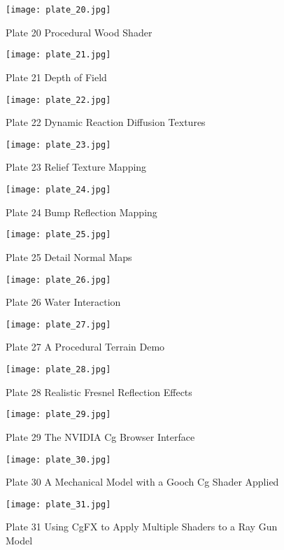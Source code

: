 \documentclass[../main.tex]{subfiles}
\begin{document}
\FloatBarrier
\begin{figure}
    \centering
    \texttt{[image: plate\_20.jpg]}
    \caption{Plate 20 Procedural Wood Shader}
    \label{fig:plate-20}
\end{figure}
\FloatBarrier
\begin{figure}
    \centering
    \texttt{[image: plate\_21.jpg]}
    \caption{Plate 21 Depth of Field}
    \label{fig:plate-21}
\end{figure}
\FloatBarrier
\begin{figure}
    \centering
    \texttt{[image: plate\_22.jpg]}
    \caption{Plate 22 Dynamic Reaction Diffusion Textures}
    \label{fig:plate-22}
\end{figure}
\FloatBarrier
\begin{figure}
    \centering
    \texttt{[image: plate\_23.jpg]}
    \caption{Plate 23 Relief Texture Mapping}
    \label{fig:plate-23}
\end{figure}
\FloatBarrier
\begin{figure}
    \centering
    \texttt{[image: plate\_24.jpg]}
    \caption{Plate 24 Bump Reflection Mapping}
    \label{fig:plate-24}
\end{figure}
\FloatBarrier
\begin{figure}
    \centering
    \texttt{[image: plate\_25.jpg]}
    \caption{Plate 25 Detail Normal Maps}
    \label{fig:plate-25}
\end{figure}
\FloatBarrier
\begin{figure}
    \centering
    \texttt{[image: plate\_26.jpg]}
    \caption{Plate 26 Water Interaction}
    \label{fig:plate-26}
\end{figure}
\FloatBarrier
\begin{figure}
    \centering
    \texttt{[image: plate\_27.jpg]}
    \caption{Plate 27 A Procedural Terrain Demo}
    \label{fig:plate-27}
\end{figure}
\FloatBarrier
\begin{figure}
    \centering
    \texttt{[image: plate\_28.jpg]}
    \caption{Plate 28 Realistic Fresnel Reflection Effects}
    \label{fig:plate-28}
\end{figure}
\FloatBarrier
\begin{figure}
    \centering
    \texttt{[image: plate\_29.jpg]}
    \caption{Plate 29 The NVIDIA Cg Browser Interface}
    \label{fig:plate-29}
\end{figure}
\FloatBarrier
\begin{figure}
    \centering
    \texttt{[image: plate\_30.jpg]}
    \caption{Plate 30 A Mechanical Model with a Gooch Cg Shader Applied}
    \label{fig:plate-30}
\end{figure}
\FloatBarrier
\begin{figure}
    \centering
    \texttt{[image: plate\_31.jpg]}
    \caption{Plate 31 Using CgFX to Apply Multiple Shaders to a Ray Gun Model}
    \label{fig:plate-31}
\end{figure}
\FloatBarrier
\end{document}
